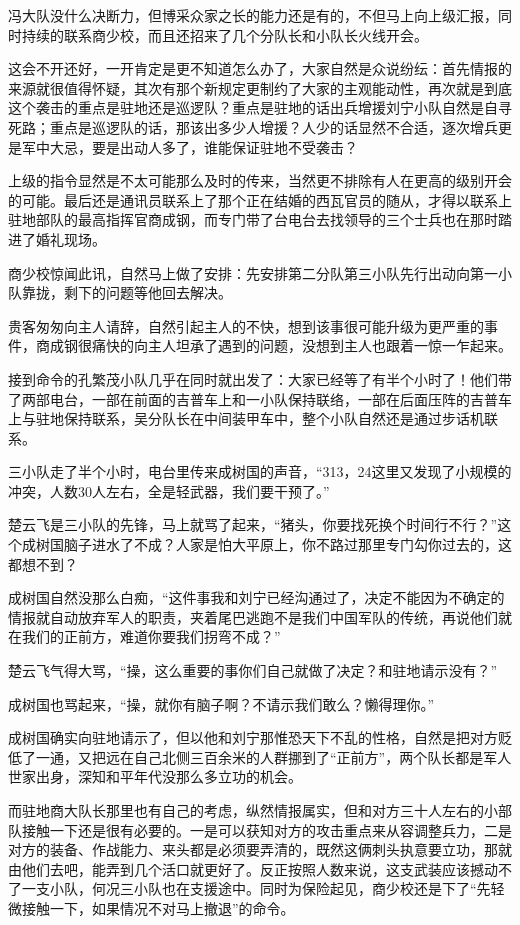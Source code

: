 冯大队没什么决断力，但博采众家之长的能力还是有的，不但马上向上级汇报，同时持续的联系商少校，而且还招来了几个分队长和小队长火线开会。

这会不开还好，一开肯定是更不知道怎么办了，大家自然是众说纷纭：首先情报的来源就很值得怀疑，其次有那个新规定更制约了大家的主观能动性，再次就是到底这个袭击的重点是驻地还是巡逻队？重点是驻地的话出兵增援刘宁小队自然是自寻死路；重点是巡逻队的话，那该出多少人增援？人少的话显然不合适，逐次增兵更是军中大忌，要是出动人多了，谁能保证驻地不受袭击？

上级的指令显然是不太可能那么及时的传来，当然更不排除有人在更高的级别开会的可能。最后还是通讯员联系上了那个正在结婚的西瓦官员的随从，才得以联系上驻地部队的最高指挥官商成钢，而专门带了台电台去找领导的三个士兵也在那时踏进了婚礼现场。

商少校惊闻此讯，自然马上做了安排：先安排第二分队第三小队先行出动向第一小队靠拢，剩下的问题等他回去解决。

贵客匆匆向主人请辞，自然引起主人的不快，想到该事很可能升级为更严重的事件，商成钢很痛快的向主人坦承了遇到的问题，没想到主人也跟着一惊一乍起来。

接到命令的孔繁茂小队几乎在同时就出发了：大家已经等了有半个小时了！他们带了两部电台，一部在前面的吉普车上和一小队保持联络，一部在后面压阵的吉普车上与驻地保持联系，吴分队长在中间装甲车中，整个小队自然还是通过步话机联系。

三小队走了半个小时，电台里传来成树国的声音，“313，24这里又发现了小规模的冲突，人数30人左右，全是轻武器，我们要干预了。”

楚云飞是三小队的先锋，马上就骂了起来，“猪头，你要找死换个时间行不行？”这个成树国脑子进水了不成？人家是怕大平原上，你不路过那里专门勾你过去的，这都想不到？

成树国自然没那么白痴，“这件事我和刘宁已经沟通过了，决定不能因为不确定的情报就自动放弃军人的职责，夹着尾巴逃跑不是我们中国军队的传统，再说他们就在我们的正前方，难道你要我们拐弯不成？”

楚云飞气得大骂，“操，这么重要的事你们自己就做了决定？和驻地请示没有？”

成树国也骂起来，“操，就你有脑子啊？不请示我们敢么？懒得理你。”

成树国确实向驻地请示了，但以他和刘宁那惟恐天下不乱的性格，自然是把对方贬低了一通，又把远在自己北侧三百余米的人群挪到了“正前方”，两个队长都是军人世家出身，深知和平年代没那么多立功的机会。

而驻地商大队长那里也有自己的考虑，纵然情报属实，但和对方三十人左右的小部队接触一下还是很有必要的。一是可以获知对方的攻击重点来从容调整兵力，二是对方的装备、作战能力、来头都是必须要弄清的，既然这俩刺头执意要立功，那就由他们去吧，能弄到几个活口就更好了。反正按照人数来说，这支武装应该撼动不了一支小队，何况三小队也在支援途中。同时为保险起见，商少校还是下了“先轻微接触一下，如果情况不对马上撤退”的命令。

